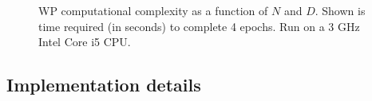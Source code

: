 \begin{figure}[t]
  \centering
  \caption{
    WP computational complexity as a function of $N$ and $D$.
    Shown is time required (in seconds) to complete 4 epochs.
    Run on a 3 GHz Intel Core i5 CPU.
  }
  \label{fig:wp-computational-cost}
\end{figure}


\subsection{Implementation details}

